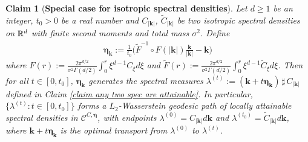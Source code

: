\documentclass[10pt,noinfoline]{imsart}
\newtheorem{claim}{Claim}
\newcommand{\bs}{\boldsymbol}
\begin{document}
\begin{claim}[\textbf{Special case for isotropic spectral densities}]
\label{claim: isotropic spectral densities}
Let $d\geq 1$ be an integer, $t_0 > 0$ be a real number and $C_{|\bs k|}$, $\tilde C_{|\bs k|}$ be two isotropic spectral densities on $\Bbb R^d$ with finite second moments and total mass $\sigma^2$. Define
\begin{align}
\bs \eta_{\bs k}:= \frac{1}{t_0}\Big(\tilde F^{-1}\circ F(|\bs k|)\frac{\bs k}{|\bs k|}-\bs k\Big)
\end{align} 
 where $F(r) := \frac{2\pi^{d/2}}{\sigma^2\Gamma(d/2)}\int_0^r \xi^{d-1}C_\xi d\xi$ and $\tilde F(r) := \frac{2\pi^{d/2}}{\sigma^2\Gamma(d/2)}\int_0^r \xi^{d-1}\tilde C_\xi d\xi$. Then for all $t\in[0,t_0]$, $\bs \eta_{\bs k}$ generates the spectral measures $\lambda^{(t)}:= (\bs k + t\bs \eta_{\bs k})\,\sharp\, C_{|\bs k|} $ defined in Claim \ref{claim any two spec are attainable}. In particular, $\{\lambda^{(t)} \colon t\in[0,t_0]\}$ forms a $L_2$-Wasserstein geodesic path of locally attainable spectral densities in $\mathscr C^{C,\bs \eta}$, with endpoints $\lambda^{(0)}=C_{|\bs k|}d\bs k$ and $\lambda^{(t_0)}=\tilde C_{|\bs k|}d\bs k$, where
$\bs k + t\bs \eta_{\bs k}$ is the optimal transport from $\lambda^{(0)}$ to $\lambda^{(t)}$.
\end{claim}
\end{document}
